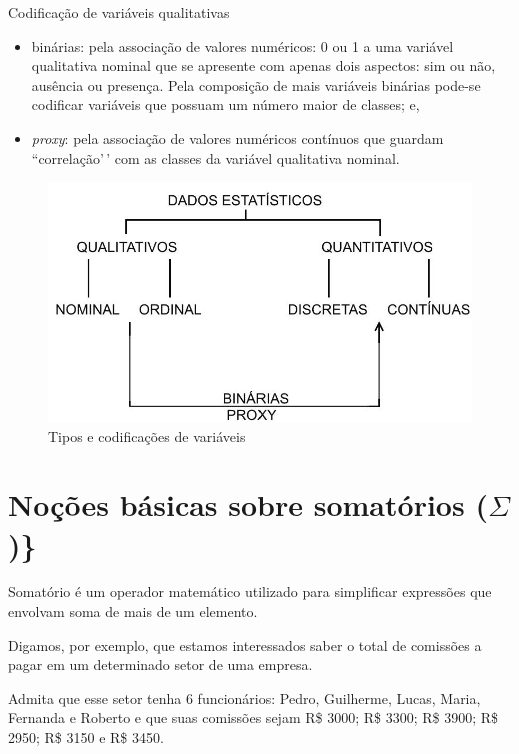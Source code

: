 \documentclass[
]{book}
\providecommand{\tightlist}{%
  \setlength{\itemsep}{0pt}\setlength{\parskip}{0pt}}
\begin{document}
Codificação de variáveis qualitativas

\begin{itemize}
\tightlist
\item
  binárias: pela associação de valores numéricos: 0 ou 1 a uma variável qualitativa nominal que se apresente com apenas dois aspectos: sim ou não, ausência ou presença. Pela composição de mais variáveis binárias pode-se codificar variáveis que possuam um número maior de classes; e,
\item
  \emph{proxy}: pela associação de valores numéricos contínuos que guardam ``correlação'\,' com as classes da variável qualitativa nominal.
\end{itemize}

\begin{figure}

{\centering \includegraphics[width=0.75\linewidth]{images2/tipos_variaveis} 

}

\caption{Tipos e codificações de variáveis }\label{fig:unnamed-chunk-25}
\end{figure}

\hypertarget{nouxe7uxf5es-buxe1sicas-sobre-somatuxf3rios-sigma}{%
\section{\texorpdfstring{Noções básicas sobre somatórios (\(\Sigma\))\}}{Noções básicas sobre somatórios (\textbackslash Sigma)\}}}\label{nouxe7uxf5es-buxe1sicas-sobre-somatuxf3rios-sigma}}

Somatório é um operador matemático utilizado para simplificar expressões que envolvam soma de mais de um elemento.

Digamos, por exemplo, que estamos interessados saber o total de comissões a pagar em um determinado setor de uma empresa.

Admita que esse setor tenha 6 funcionários: Pedro, Guilherme, Lucas, Maria, Fernanda e Roberto e que suas comissões sejam R\$ 3000; R\$ 3300; R\$ 3900; R\$ 2950; R\$ 3150 e R\$ 3450.
\end{document}
